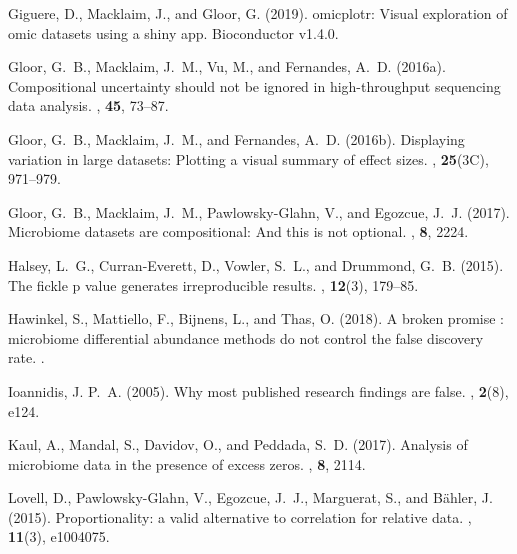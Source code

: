 \documentclass[11pt]{article}
\begin{document}
\begin{thebibliography}{}
Giguere, D., Macklaim, J., and Gloor, G. (2019).
\newblock omicplotr: Visual exploration of omic datasets using a shiny app.
\newblock Bioconductor v1.4.0.

Gloor, G.~B., Macklaim, J.~M., Vu, M., and Fernandes, A.~D. (2016a).
\newblock Compositional uncertainty should not be ignored in high-throughput
  sequencing data analysis.
, {\bf 45}, 73--87.

Gloor, G.~B., Macklaim, J.~M., and Fernandes, A.~D. (2016b).
\newblock Displaying variation in large datasets: Plotting a visual summary of
  effect sizes.
, {\bf
  25}(3C), 971--979.

Gloor, G.~B., Macklaim, J.~M., Pawlowsky-Glahn, V., and Egozcue, J.~J. (2017).
\newblock Microbiome datasets are compositional: And this is not optional.
, {\bf 8}, 2224.

Halsey, L.~G., Curran-Everett, D., Vowler, S.~L., and Drummond, G.~B. (2015).
\newblock The fickle p value generates irreproducible results.
, {\bf 12}(3), 179--85.

Hawinkel, S., Mattiello, F., Bijnens, L., and Thas, O. (2018).
\newblock A broken promise : microbiome differential abundance methods do not
  control the false discovery rate.
.

Ioannidis, J. P.~A. (2005).
\newblock Why most published research findings are false.
, {\bf 2}(8), e124.

Kaul, A., Mandal, S., Davidov, O., and Peddada, S.~D. (2017).
\newblock Analysis of microbiome data in the presence of excess zeros.
, {\bf 8}, 2114.

Lovell, D., Pawlowsky-Glahn, V., Egozcue, J.~J., Marguerat, S., and B{\"a}hler,
  J. (2015).
\newblock Proportionality: a valid alternative to correlation for relative
  data.
, {\bf 11}(3), e1004075.


\end{thebibliography}
\end{document}
